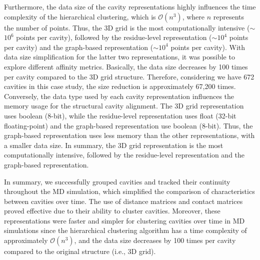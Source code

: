 \documentclass[Ingles]{phdthesis}
\def\ie{i.e.\onedot}
\begin{document}
Furthermore, the data size of the cavity representations highly influences the time complexity of the hierarchical clustering, which is $\mathcal{O}(n^3)$, where $n$ represents the number of points. Thus, the 3D grid is the most computationally intensive ($\sim$$10^6$ points per cavity), followed by the residue-level representation ($\sim$$10^4$ points per cavity) and the graph-based representation ($\sim$$10^4$ points per cavity). With data size simplification for the latter two representations, it was possible to explore different affinity metrics. Basically, the data size decreases by 100 times per cavity compared to the 3D grid structure. Therefore, considering we have 672 cavities in this case study, the size reduction is approximately 67,200 times. Conversely, the data type used by each cavity representation influences the memory usage for the structural cavity alignment. The 3D grid representation uses boolean (8-bit), while the residue-level representation uses float (32-bit floating-point) and the graph-based representation use boolean (8-bit). Thus, the graph-based representation uses less memory than the other representations, with a smaller data size. In summary, the 3D grid representation is the most computationally intensive, followed by the residue-level representation and the graph-based representation. 

In summary, we successfully grouped cavities and tracked their continuity throughout the \acs{MD} simulation, which simplified the comparison of characteristics between cavities over time. The use of distance matrices and contact matrices proved effective due to their ability to cluster cavities. Moreover, these representations were faster and simpler for clustering cavities over time in MD simulations since the hierarchical clustering algorithm has a time complexity of approximately $\mathcal{O}(n^3)$, and the data size decreases by 100 times per cavity compared to the original structure (\ie, 3D grid).


\end{document}
